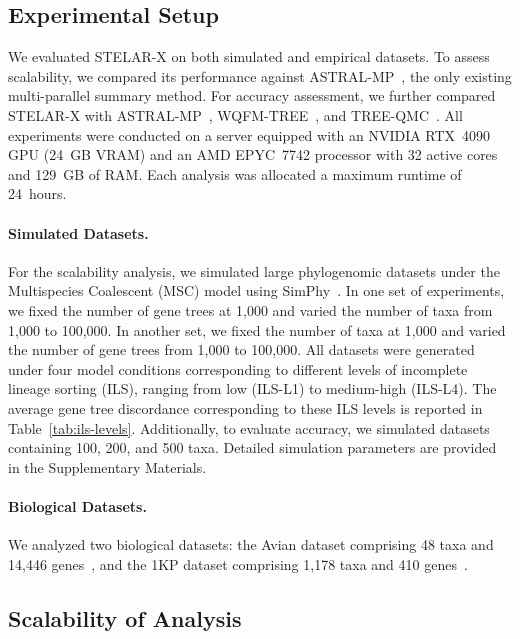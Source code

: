 \documentclass[10pt,a4paper]{article}
\begin{document}
\subsection{Experimental Setup}

We evaluated STELAR-X on both simulated and empirical datasets. To assess scalability, we compared its performance against ASTRAL-MP~\cite{astral-mp}, the only existing multi-parallel summary method. For accuracy assessment, we further compared STELAR-X with ASTRAL-MP~\cite{astral-mp}, WQFM-TREE~\cite{wqfm-tree-rafi2025}, and TREE-QMC~\cite{Han-tree-qmc-2023}. All experiments were conducted on a server equipped with an NVIDIA RTX~4090 GPU (24~GB VRAM) and an AMD EPYC~7742 processor with 32 active cores and 129~GB of RAM. Each analysis was allocated a maximum runtime of 24~hours.

\paragraph{Simulated Datasets.} For the scalability analysis, we simulated large phylogenomic datasets under the Multispecies Coalescent (MSC) model using SimPhy~\cite{10.1093/sysbio/syv082-simphy}. In one set of experiments, we fixed the number of gene trees at 1{,}000 and varied the number of taxa from 1{,}000 to 100{,}000. In another set, we fixed the number of taxa at 1{,}000 and varied the number of gene trees from 1{,}000 to 100{,}000. All datasets were generated under four model conditions corresponding to different levels of incomplete lineage sorting (ILS), ranging from low (ILS-L1) to medium-high (ILS-L4). The average gene tree discordance corresponding to these ILS levels is reported in Table~\ref{tab:ils-levels}. Additionally, to evaluate accuracy, we simulated datasets containing 100, 200, and 500 taxa. Detailed simulation parameters are provided in the Supplementary Materials.

\paragraph{Biological Datasets.} 
We analyzed two biological datasets: the Avian dataset comprising 48 taxa and 14{,}446 genes~\cite{Jarvis-Avian-48-taxa-2014}, and the 1KP dataset comprising 1{,}178 taxa and 410 genes~\cite{1kp}.


\subsection{Scalability of Analysis}
\end{document}
